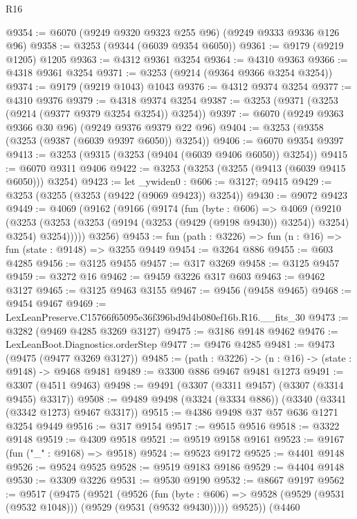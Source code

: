 \begin{lexlean}{R16}
\begin{coremodule}
@9354 := @6070 (@9249 @9320 @9323 @255 @96) (@9249 @9333 @9336 @126 @96)
@9358 := @3253 (@9344 (@6039 @9354 @6050))
@9361 := @9179 (@9219 @1205) @1205
@9363 := @4312 @9361 @3254
@9364 := @4310 @9363
@9366 := @4318 @9361 @3254
@9371 := @3253 (@9214 (@9364 @9366 @3254 @3254))
@9374 := @9179 (@9219 @1043) @1043
@9376 := @4312 @9374 @3254
@9377 := @4310 @9376
@9379 := @4318 @9374 @3254
@9387 := @3253 (@9371 (@3253 (@9214 (@9377 @9379 @3254 @3254)) @3254))
@9397 := @6070 (@9249 @9363 @9366 @30 @96) (@9249 @9376 @9379 @22 @96)
@9404 := @3253 (@9358 (@3253 (@9387 (@6039 @9397 @6050)) @3254))
@9406 := @6070 @9354 @9397
@9413 := @3253 (@9315 (@3253 (@9404 (@6039 @9406 @6050)) @3254))
@9415 := @6070 @9311 @9406
@9422 := @3253 (@3253 (@3255 (@9413 (@6039 @9415 @6050))) @3254)
@9423 := let _ywiden0 : @606 := @3127; @9415
@9429 := @3253 (@3255 (@3253 (@9422 (@9069 @9423)) @3254))
@9430 := @9072 @9423
@9449 := @4069
    (@9162
      (@9166
        (@9174
          (fun (byte : @606) =>
          @4069
            (@9210
              (@3253
                (@3253 (@3253 (@9194 (@3253 (@9429 (@9198 @9430)) @3254)) @3254) @3254)
                @3254)))))
      @3256)
@9453 := fun (path : @3226) => fun (n : @16) => fun (state : @9148) => @3255 @9449
@9454 := @3264 @886
@9455 := @603 @4285
@9456 := @3125 @9455
@9457 := @317 @3269
@9458 := @3125 @9457
@9459 := @3272 @16
@9462 := @9459 @3226 @317 @603
@9463 := @9462 @3127
@9465 := @3125 @9463 @3155
@9467 := @9456 (@9458 @9465)
@9468 := @9454 @9467
@9469 := LexLeanPreserve.C15766f65095e36f396bd9d4b080ef16b.R16.__fits_30
@9473 := @3282 (@9469 @4285 @3269 @3127)
@9475 := @3186 @9148 @9462
@9476 := LexLeanBoot.Diagnostics.orderStep
@9477 := @9476 @4285
@9481 := @9473 (@9475 (@9477 @3269 @3127))
@9485 := (path : @3226) -> (n : @16) -> (state : @9148) -> @9468 @9481
@9489 := @3300 @886 @9467 @9481 @1273
@9491 := @3307 (@4511 @9463)
@9498 := @9491 (@3307 (@3311 @9457) (@3307 (@3314 @9455) @3317))
@9508 := @9489 @9498 (@3324 (@3334 @886)) (@3340 (@3341 (@3342 @1273) @9467 @3317))
@9515 := @4386 @9498 @37 @57 @636 @1271 @3254 @9449
@9516 := @317 @9154
@9517 := @9515 @9516
@9518 := @3322 @9148
@9519 := @4309 @9518
@9521 := @9519 @9158 @9161
@9523 := @9167 (fun ("_" : @9168) => @9518)
@9524 := @9523 @9172
@9525 := @4401 @9148
@9526 := @9524 @9525
@9528 := @9519 @9183 @9186
@9529 := @4404 @9148
@9530 := @3309 @3226
@9531 := @9530 @9190
@9532 := @8667 @9197
@9562 := @9517
    (@9475
      (@9521
        (@9526
          (fun (byte : @606) => @9528 (@9529 (@9531 (@9532 @1048))) (@9529 (@9531 (@9532 @9430)))))
        @9525))
    (@4460

\end{coremodule}
\end{lexlean}
